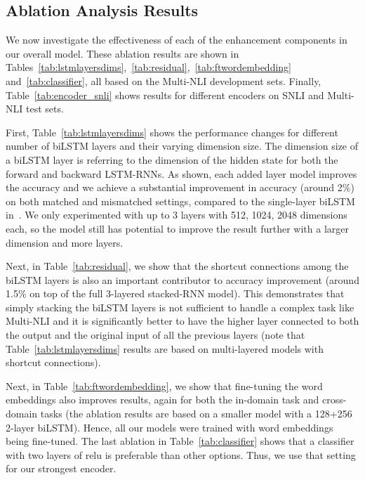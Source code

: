 \documentclass[11pt,letterpaper]{article}
\begin{document}
\subsection{Ablation Analysis Results}
We now investigate the effectiveness of each of the enhancement components in our overall model. These ablation results are shown in Tables~\ref{tab:lstmlayersdims},~\ref{tab:residual},~\ref{tab:ftwordembedding} and~\ref{tab:classifier}, all based on the Multi-NLI development sets. Finally, Table~\ref{tab:encoder_snli} shows results for different encoders on SNLI and Multi-NLI test sets.

%

First, Table~\ref{tab:lstmlayersdims} shows the performance changes for different number of biLSTM layers and their varying dimension size. The dimension size of a biLSTM layer is referring to the dimension of the hidden state for both the forward and backward LSTM-RNNs. As shown, each added layer model improves the accuracy and we achieve a substantial improvement in accuracy (around 2\%) on both matched and mismatched settings, compared to the single-layer biLSTM in~. We only experimented with up to 3 layers with 512, 1024, 2048 dimensions each, so the model still has potential to improve the result further with a larger dimension and more layers.




Next, in Table~\ref{tab:residual}, we show that the shortcut connections among the biLSTM layers is also an important contributor to accuracy improvement (around 1.5\% on top of the full 3-layered stacked-RNN model). This demonstrates that simply stacking the biLSTM layers is not sufficient to handle a complex task like Multi-NLI and it is significantly better to have the higher layer connected to both the output and the original input of all the previous layers (note that Table~\ref{tab:lstmlayersdims} results are based on multi-layered models with shortcut connections).

Next, in Table~\ref{tab:ftwordembedding}, we show that fine-tuning the word embeddings also improves results, again for both the in-domain task and cross-domain tasks (the ablation results are based on a smaller model with a 128+256 2-layer biLSTM). Hence, all our models were trained with word embeddings being fine-tuned. 
%
The last ablation in Table~\ref{tab:classifier} shows that a classifier with two layers of relu is preferable than other options. Thus, we use that setting for our strongest encoder.
\end{document}
